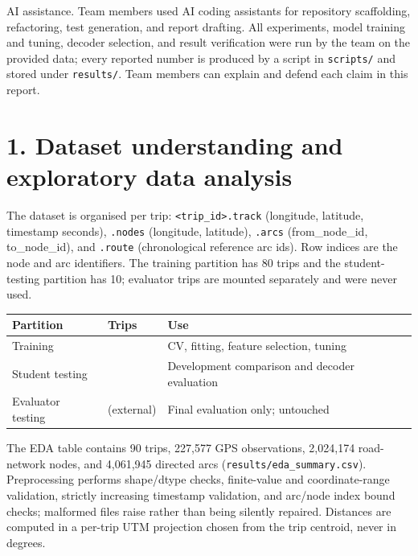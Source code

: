 \documentclass[11pt,a4paper]{article}
\newcommand{\code}[1]{\texttt{\small #1}}
\begin{document}
AI assistance. Team members used AI coding assistants for repository scaffolding, refactoring, test generation, and report drafting. All experiments, model training and tuning, decoder selection, and result verification were run by the team on the provided data; every reported number is produced by a script in \code{scripts/\allowbreak{}} and stored under \code{results/\allowbreak{}}. Team members can explain and defend each claim in this report.

\section{1. Dataset understanding and exploratory data analysis}

The dataset is organised per trip: \code{\textless{}trip\_\allowbreak{}id\textgreater{}.\allowbreak{}track} (longitude, latitude, timestamp seconds), \code{.\allowbreak{}nodes} (longitude, latitude), \code{.\allowbreak{}arcs} (from\_node\_id, to\_node\_id), and \code{.\allowbreak{}route} (chronological reference arc ids). Row indices are the node and arc identifiers. The training partition has 80 trips and the student-testing partition has 10; evaluator trips are mounted separately and were never used.

\begin{table}[H]
\centering
\footnotesize
\begin{tabularx}{\textwidth}{>{\raggedright\arraybackslash}p{3.59cm}>{\raggedright\arraybackslash}p{2.64cm}>{\raggedright\arraybackslash}p{9.11cm}}
\toprule
\textbf{Partition} & \textbf{Trips} & \textbf{Use} \\
\midrule
Training & 80 & CV,\allowbreak{} fitting,\allowbreak{} feature selection,\allowbreak{} tuning \\
Student testing & 10 & Development comparison and decoder evaluation \\
Evaluator testing & 10 (external) & Final evaluation only; untouched \\
\bottomrule
\end{tabularx}
\end{table}

The EDA table contains 90 trips, 227,577 GPS observations, 2,024,174 road-network nodes, and 4,061,945 directed arcs (\code{results/\allowbreak{}eda\_\allowbreak{}summary.\allowbreak{}csv}). Preprocessing performs shape/dtype checks, finite-value and coordinate-range validation, strictly increasing timestamp validation, and arc/node index bound checks; malformed files raise rather than being silently repaired. Distances are computed in a per-trip UTM projection chosen from the trip centroid, never in degrees.
\end{document}
